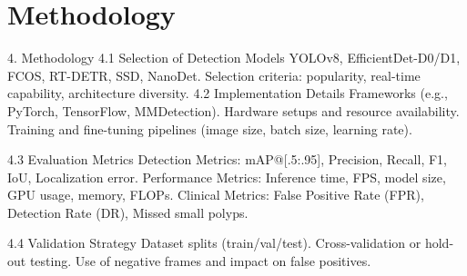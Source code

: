 \section{Methodology}
\label{sec:method}

4. Methodology
    4.1 Selection of Detection Models
        YOLOv8, EfficientDet-D0/D1, FCOS, RT-DETR, SSD, NanoDet.
        Selection criteria: popularity, real-time capability, architecture diversity.
    4.2 Implementation Details
        Frameworks (e.g., PyTorch, TensorFlow, MMDetection).
        Hardware setups and resource availability.
        Training and fine-tuning pipelines (image size, batch size, learning rate).

    4.3 Evaluation Metrics
        Detection Metrics: mAP@[.5:.95], Precision, Recall, F1, IoU, Localization error.
        Performance Metrics: Inference time, FPS, model size, GPU usage, memory, FLOPs.
        Clinical Metrics: False Positive Rate (FPR), Detection Rate (DR), Missed small polyps.

    4.4 Validation Strategy
        Dataset splits (train/val/test).
        Cross-validation or hold-out testing.
        Use of negative frames and impact on false positives.
